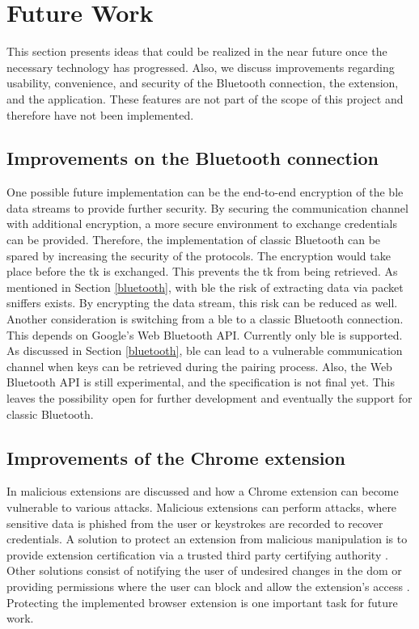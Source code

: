 \section{Future Work} \label{futurework}
This section presents ideas that could be realized in the near future once the necessary technology has progressed. Also, we discuss improvements regarding usability, convenience, and security of the Bluetooth connection, the extension, and the application. These features are not part of the scope of this project and therefore have not been implemented.

\subsection{Improvements on the Bluetooth connection}
One possible future implementation can be the end-to-end encryption of the \gls{ble} data streams to provide further security. By securing the communication channel with additional encryption, a more secure environment to exchange credentials can be provided. Therefore, the implementation of classic Bluetooth can be spared by increasing the security of the protocols. The encryption would take place before the \gls{tk} is exchanged. This prevents the \gls{tk} from being retrieved. As mentioned in Section \ref{bluetooth}, with \gls{ble} the risk of extracting data  via packet sniffers  exists. By encrypting the data stream, this risk can be reduced as well. \\

Another consideration is switching from a \gls{ble} to a classic Bluetooth connection. This depends on Google's Web Bluetooth API. Currently only \gls{ble} is supported. As discussed in Section \ref{bluetooth}, \gls{ble} can lead to a vulnerable communication channel when keys can be retrieved during the pairing process. Also, the Web Bluetooth API is still experimental, and the specification is not final yet. This leaves the possibility open for further development and eventually the support for classic Bluetooth.
 
\subsection{Improvements of the Chrome extension}
In \cite{VarshneyBS18} malicious extensions are discussed and how a Chrome extension can become vulnerable to various attacks. Malicious extensions can perform attacks, where sensitive data is phished from the user or keystrokes are recorded to recover credentials. A solution to protect an extension from malicious manipulation is to provide extension certification via a trusted third party certifying authority \cite{VarshneyBS18}. Other solutions consist of notifying the user of undesired changes in the \gls{dom} or providing permissions where the user can block and allow the extension's access \cite{VarshneyBS18}. Protecting the implemented browser extension is one important task for future work. \\

